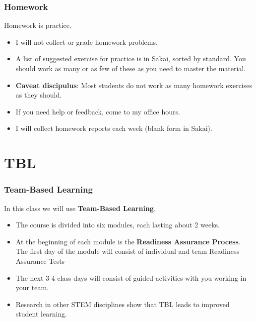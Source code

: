 \documentclass{beamer}
\begin{document}
\begin{frame}\frametitle{Homework}
Homework is practice.
\begin{itemize}
\item I will not collect or grade homework problems.  
\item A list of suggested exercise for practice is in Sakai, sorted by standard.  You should work as many or as few of these as you need to master the material.
\item {\bf Caveat discipulus}: Most students do not work as many homework exercises as they should.
\item If you need help or feedback, come to my office hours.
\item I will collect homework reports each week (blank form in Sakai).
\end{itemize}
\end{frame}

\section{TBL}

\begin{frame}\frametitle{Team-Based Learning}
In this class we will use {\bf Team-Based Learning}.
\begin{itemize}
\item The course is divided into six modules, each lasting about 2 weeks.
\item At the beginning of each module is the {\bf Readiness Assurance Process}.  The first day of the module will consist of individual and team Readiness Assurance Tests
\item The next 3-4 class days will consist of guided activities with you working in your team.
\item Research in other STEM disciplines show that TBL leads to improved student learning.
\end{itemize}
\end{frame}
\end{document}
